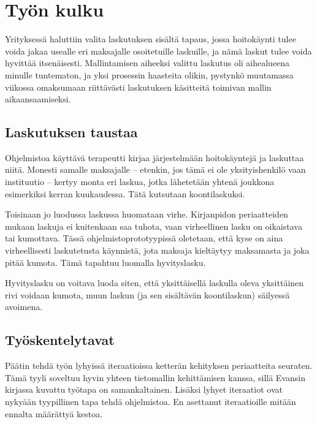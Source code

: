 \hypertarget{tyuxf6n-kulku}{%
\chapter{Työn kulku}\label{tyuxf6n-kulku}}

Yrityksessä haluttiin valita laskutuksen sisältä tapaus, jossa
hoitokäynti tulee voida jakaa usealle eri maksajalle osoitetuille
laskuille, ja nämä laskut tulee voida hyvittää itsenäisesti.
Mallintamisen aiheeksi valittu laskutus oli aihealueena minulle
tuntematon, ja yksi prosessin haasteita olikin, pystynkö muutamassa
viikossa omaksumaan riittävästi laskutuksen käsitteitä toimivan mallin
aikaansaamiseksi.

\hypertarget{laskutuksen-taustaa}{%
\section{Laskutuksen taustaa}\label{laskutuksen-taustaa}}

Ohjelmistoa käyttävä terapeutti kirjaa järjestelmään hoitokäyntejä ja
laskuttaa niitä. Monesti samalle maksajalle -- etenkin, jos tämä ei ole
yksityishenkilö vaan instituutio -- kertyy monta eri laskua, jotka
lähetetään yhtenä joukkona esimerkiksi kerran kuukaudessa. Tätä
kutsutaan koontilaskuksi.

Toisinaan jo luodussa laskussa huomataan virhe. Kirjanpidon
periaatteiden mukaan laskuja ei kuitenkaan saa tuhota, vaan virheellinen
lasku on oikaistava tai kumottava. Tässä ohjelmistoprototyypissä
oletetaan, että kyse on aina virheellisesti laskutetusta käynnistä, jota
maksaja kieltäytyy maksamasta ja joka pitää kumota. Tämä tapahtuu
luomalla hyvityslasku.

Hyvityslasku on voitava luoda siten, että yksittäisellä laskulla oleva
yksittäinen rivi voidaan kumota, muun laskun (ja sen sisältävän
koontilaskun) säilyessä avoimena.

\hypertarget{tyuxf6skentelytavat}{%
\section{Työskentelytavat}\label{tyuxf6skentelytavat}}

Päätin tehdä työn lyhyissä iteraatioissa ketterän kehityksen
periaatteita seuraten. Tämä tyyli soveltuu hyvin yhteen tietomallin
kehittämisen kanssa, sillä Evansin kirjassa kuvattu työtapa on
samankaltainen. Lisäksi lyhyet iteraatiot ovat nykyään tyypillinen tapa
tehdä ohjelmistoa.\cites{ConsultancyEu2020May}{AgileIteration} En
asettanut iteraatioille mitään ennalta määrättyä kestoa.


